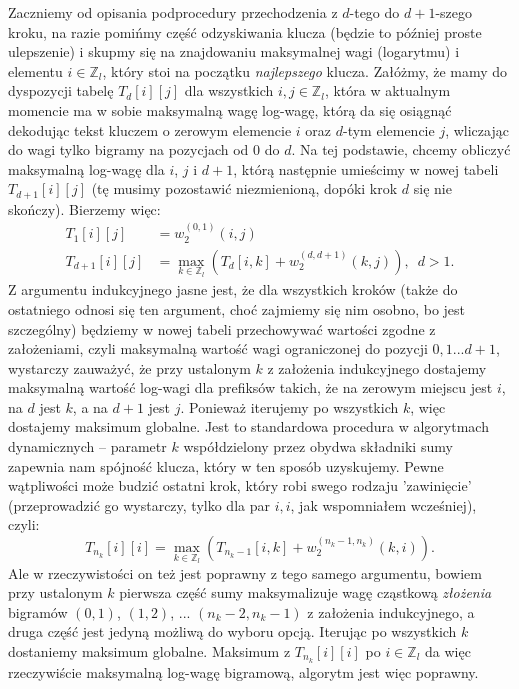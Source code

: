 \documentclass[a4paper]{article}
\theoremstyle{defn}
\theoremstyle{theorem}
\theoremstyle{lemma}
\theoremstyle{cor}
\theoremstyle{fact}
\begin{document}
Zaczniemy od opisania podprocedury przechodzenia z $d$-tego do $d+1$-szego kroku, na razie pomińmy część odzyskiwania klucza (będzie to później proste ulepszenie) i skupmy się na znajdowaniu maksymalnej wagi (logarytmu) i elementu $i \in \mathbb{Z}_l$, który stoi na początku \textit{najlepszego} klucza. Załóżmy, że mamy do dyspozycji tabelę $T_d[i][j]$ dla wszystkich $i,j \in \mathbb{Z}_l$, która w aktualnym momencie ma w sobie maksymalną wagę log-wagę, którą da się osiągnąć dekodując tekst kluczem o zerowym elemencie $i$ oraz $d$-tym elemencie $j$, wliczając do wagi tylko bigramy na pozycjach od 0 do $d$. Na tej podstawie, chcemy obliczyć maksymalną log-wagę dla $i$, $j$ i $d+1$, którą następnie umieścimy w nowej tabeli $T_{d+1}[i][j]$ (tę musimy pozostawić niezmienioną, dopóki krok $d$ się nie skończy). Bierzemy więc:
\begin{align*}
T_{1}[i][j] &= w_2^{(0,1)}(i, j) \\
T_{d+1}[i][j] &= \max_{k \in \mathbb{Z}_l}( T_{d}[i, k] + w_2^{(d,d+1)}(k, j)),\,\,\, d > 1.
\end{align*}
Z argumentu indukcyjnego jasne jest, że dla wszystkich kroków (także do ostatniego odnosi się ten argument, choć zajmiemy się nim osobno, bo jest szczególny) będziemy w nowej tabeli przechowywać wartości zgodne z założeniami, czyli maksymalną wartość wagi ograniczonej do pozycji $0, 1 ...d+1$, wystarczy zauważyć, że przy ustalonym $k$ z założenia indukcyjnego dostajemy maksymalną wartość log-wagi dla prefiksów takich, że na zerowym miejscu jest $i$, na $d$ jest $k$, a na $d+1$ jest $j$. Ponieważ iterujemy po wszystkich $k$, więc dostajemy maksimum globalne. Jest to standardowa procedura w algorytmach dynamicznych – parametr $k$ współdzielony przez obydwa składniki sumy zapewnia nam spójność klucza, który w ten sposób uzyskujemy. Pewne wątpliwości może budzić ostatni krok, który robi swego rodzaju 'zawinięcie' (przeprowadzić go wystarczy, tylko dla par $i,i$, jak wspomniałem wcześniej), czyli:
$$T_{n_k}[i][i] = \max_{k \in \mathbb{Z}_l} (T_{n_k-1}[i, k] + w_2^{(n_k-1,n_k)}(k, i)).$$
Ale w rzeczywistości  on też jest poprawny z tego samego argumentu, bowiem przy ustalonym $k$ pierwsza część sumy maksymalizuje wagę cząstkową \textit{złożenia} bigramów $(0,1)$, $(1,2)$, ... $(n_k-2, n_k-1)$ z założenia indukcyjnego, a druga część jest jedyną możliwą do wyboru opcją. Iterując po wszystkich $k$ dostaniemy maksimum globalne. Maksimum z $T_{n_k}[i][i]$ po $i \in \mathbb{Z}_l$ da więc rzeczywiście maksymalną log-wagę bigramową, algorytm jest więc poprawny.\\
\end{document}
